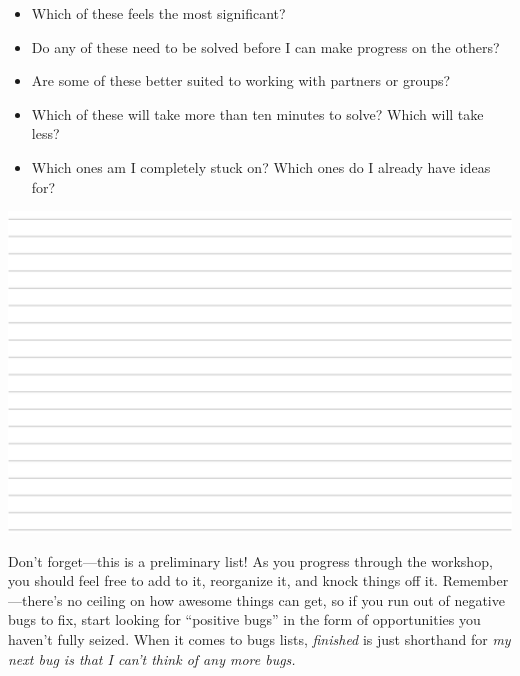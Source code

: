 \begin{itemize}
\item Which of these feels the most significant?
\item Do any of these need to be solved before I can make progress on the others? 
\item Are some of these better suited to working with partners or groups?
\item Which of these will take more than ten minutes to solve?  Which will take less?
\item Which ones am I completely stuck on?  Which ones do I already have ideas for?
\end{itemize}

\setlength{\parindent}{0em}
\includegraphics[width=\textwidth]{../../../img/lineshalf.png}
\setlength{\parindent}{1.5em}

Don't forget---this is a preliminary list!  As you progress through the workshop, you should feel free to add to it, reorganize it, and knock things off it.  Remember---there's no ceiling on how awesome things can get, so if you run out of negative bugs to fix, start looking for ``positive bugs'' in the form of opportunities you haven't fully seized.  When it comes to bugs lists, \emph{finished} is just shorthand for \emph{my next bug is that I can't think of any more bugs.}